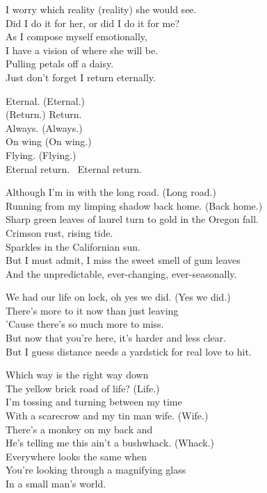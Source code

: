 I worry which reality (reality) she would see. \\
Did I do it for her, or did I do it for me? \\
As I compose myself emotionally, \\
I have a vision of where she will be. \\
Pulling petals off a daisy. \\
Just don't forget I return eternally. \\


Eternal. (Eternal.) \\
(Return.) Return. \\
Always. (Always.) \\
On wing (On wing.) \\
Flying. (Flying.) \\
Eternal return. \
Eternal return. \\


Although I'm in  with the long road. (Long road.) \\
Running from my limping shadow back home. (Back home.) \\
Sharp green leaves of laurel turn to gold in the Oregon fall. \\
Crimson rust, rising tide. \\
Sparkles in the Californian sun. \\
But I must admit, I miss the sweet smell of gum leaves \\
And the unpredictable, ever-changing, ever-seasonally. \\


We had our life on lock, oh yes we did. (Yes we did.) \\
There's more to it now than just leaving \\
'Cause there's so much more to miss. \\
But now that you're here, it's harder and less clear. \\
But I guess distance needs a yardstick for real love to hit. \\


Which way is the right way down \\
The yellow brick road of life? (Life.) \\
I'm tossing and turning between my time \\
With a scarecrow and my tin man wife. (Wife.) \\
There's a monkey on my back and \\
He's telling me this ain't a bushwhack. (Whack.) \\
Everywhere looks the same when \\
You're looking through a magnifying glass \\
In a small man's world. \\

